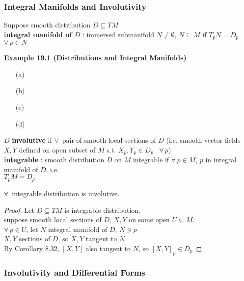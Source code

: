 \subsubsection*{Integral Manifolds and Involutivity}

Suppose smooth distribution $D \subseteq TM$ \\
\textbf{integral manifold of $D$} : immersed submanifold $N \neq \emptyset$, $N \subseteq M$ if $T_pN = D_p$ $\forall \, p \in N$

\textbf{Example 19.1 (Distributions and Integral Manifolds)}

\begin{enumerate}
\item[(a)] 
\item[(b)]
\item[(c)]
\item[(d)]
\end{enumerate}

$D$ \textbf{involutive} if $\forall \, $ pair of smooth local sections of $D$ (i.e. smooth vector fields $X,Y$ defined on open subset of $M$ s.t. $X_p, Y_p \in D_p$ \, $\forall \, p$) \\

\textbf{integrable} : smooth distribution $D$ on $M$ integrable if $\forall \, p \in M$, $p$ in integral manifold of $D$, i.e. \\
\phantom{\quad \quad \, } $T_p M = D_p$

\begin{proposition}[19.3] $\forall \, $ integrable distribution is involutive. \end{proposition}

\begin{proof} Let $D \subseteq TM$ is integrable distribution. \\
suppose smooth local sections of $D$, $X,Y$ on some open $U\subseteq M$. \\
$\forall \, p \in U$, let $N$ integral manifold of $D$, $N \ni p$ \\
$X,Y$ sections of $D$, so $X,Y$ tangent to $N$ \\
By Corollary 8.32, $[X,Y]$ also tangent to $N$, so $[X,Y]_p \in D_p$
\end{proof}



\subsubsection*{Involutivity and Differential Forms}


